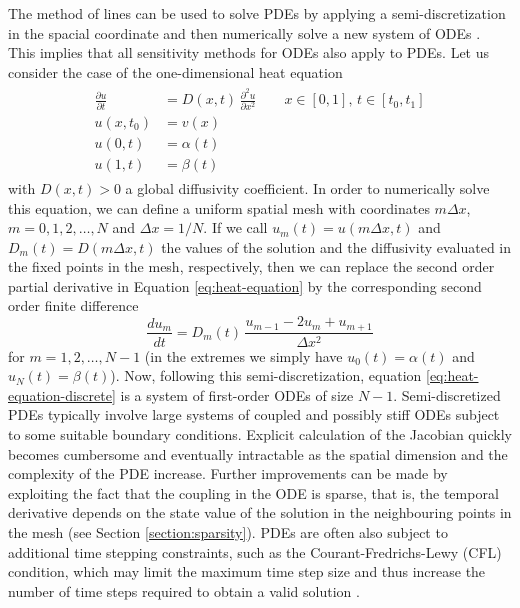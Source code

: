 The method of lines can be used to solve PDEs by applying a semi-discretization in the spacial coordinate and then numerically solve a new system of ODEs \cite{ascher2008numerical}. 
This implies that all sensitivity methods for ODEs also apply to PDEs. 
Let us consider the case of the one-dimensional heat equation
\begin{align}
\begin{split}
 \frac{\partial u}{\partial t}
 &= 
 D(x,t) \, 
 \frac{\partial^2 u}{\partial x^2} \qquad x \in [0,1], \, t \in [t_0, t_1]\\
 u(x, t_0) &= v(x) \\
 u(0, t) &= \alpha(t) \\
 u(1, t) &= \beta(t)
 \label{eq:heat-equation}
\end{split}
\end{align}
with $D(x, t) > 0$ a global diffusivity coefficient.
In order to numerically solve this equation, we can define a uniform spatial mesh with coordinates $m \Delta x$, $m=0, 1, 2, \ldots, N$ and $\Delta x = 1 / N$.
If we call $u_m(t) = u(m \Delta x, t)$ and $D_m(t) = D(m\Delta x, t)$ the values of the solution and the diffusivity evaluated in the fixed points in the mesh, respectively, then we can replace the second order partial derivative in Equation \eqref{eq:heat-equation} by the corresponding second order finite difference
\begin{equation}
 \frac{d u_m}{dt} 
 = 
 D_m(t) \, 
 \frac{u_{m-1} - 2u_m + u_{m+1}}{\Delta x^2}
 \label{eq:heat-equation-discrete}
\end{equation}
for $m = 1, 2, \ldots, N-1$ (in the extremes we simply have $u_0(t) = \alpha(t)$ and $u_N(t)=\beta(t)$).
Now, following this semi-discretization, equation \eqref{eq:heat-equation-discrete} is a system of first-order ODEs of size $N-1$.
Semi-discretized PDEs typically involve large systems of coupled and possibly stiff ODEs subject to some suitable boundary conditions. 
Explicit calculation of the Jacobian quickly becomes cumbersome and eventually intractable as the spatial dimension and the complexity of the PDE increase.
Further improvements can be made by exploiting the fact that the coupling in the ODE is sparse, that is, the temporal derivative depends on the state value of the solution in the neighbouring points in the mesh (see Section \ref{section:sparsity}).
PDEs are often also subject to additional time stepping constraints, such as the Courant-Fredrichs-Lewy (CFL) condition, which may limit the maximum time step size and thus increase the number of time steps required to obtain a valid solution \cite{courantPartialDifferenceEquations1967}. 

